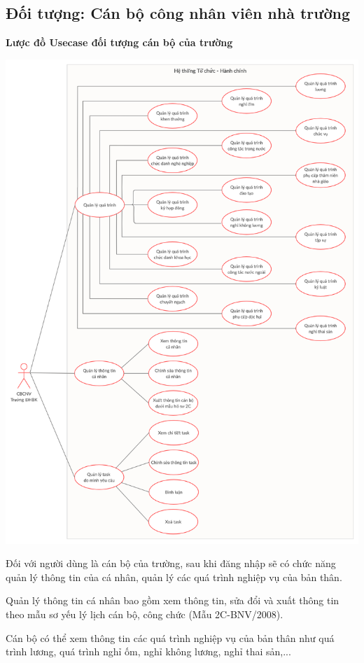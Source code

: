 \subsection{Đối tượng: Cán bộ công nhân viên nhà trường}
\textbf{Lược đồ Usecase đối tượng cán bộ của trường}
\begin{center}
  \captionsetup{type=figure}
  \includegraphics[width=15cm]{img/usecase/userUsecase.png}
\end{center}

Đối với người dùng là cán bộ của trường, sau khi đăng nhập sẽ có chức năng quản lý thông tin của cá nhân, quản lý các quá trình nghiệp vụ của bản thân.

Quản lý thông tin cá nhân bao gồm xem thông tin, sửa đổi và xuất thông tin theo mẫu sơ yếu lý lịch cán bộ, công chức (Mẫu 2C-BNV/2008).

Cán bộ có thể xem thông tin các quá trình nghiệp vụ của bản thân như quá trình lương, quá trình nghỉ ốm, nghỉ không lương, nghỉ thai sản,... 


